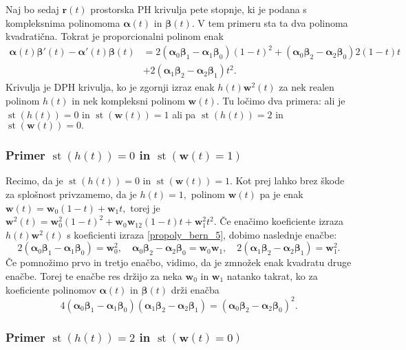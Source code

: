 \documentclass[12pt,a4paper,twoside]{article}
\theoremstyle{definition} %
\theoremstyle{plain} %
\numberwithin{equation}{section}  %
\newcommand{\rV}{\mathbf{r}}
\newcommand{\wV}{\mathbf{w}}
\newcommand{\balpha}{\boldsymbol \alpha}
\newcommand{\bbeta}{\boldsymbol \beta}
\DeclareMathOperator{\st}{st}
\begin{document}
Naj bo sedaj $\rV(t)$ prostorska PH krivulja pete stopnje, ki je podana s kompleksnima polinomoma $\balpha(t)$ in $\bbeta(t).$ V tem primeru sta ta dva polinoma kvadratična. Tokrat je proporcionalni polinom enak
\begin{align}
	\balpha(t)\bbeta'(t)-\balpha'(t)\bbeta(t)&=2(\balpha_0\bbeta_1-\balpha_1\bbeta_0)(1-t)^2+(\balpha_0\bbeta_2-\balpha_2\bbeta_0)2(1-t)t\nonumber\\
	&+2(\balpha_1\bbeta_2-\balpha_2\bbeta_1)t^2.\label{propoly_bern_5}
\end{align}
Krivulja je DPH krivulja, ko je zgornji izraz enak $h(t)\wV^2(t)$ za nek realen polinom $h(t)$ in nek kompleksni polinom $\wV(t).$ Tu ločimo dva primera: ali je $\st(h(t))=0$ in $\st(\wV(t))=1$ ali pa $\st(h(t))=2$ in $\st(\wV(t))=0.$

\subsubsection{Primer \texorpdfstring{$\st(h(t))=0$}{st(h(t))=0} in \texorpdfstring{$\st(\wV(t)=1)$}{st(w(t))=1}}

Recimo, da je $\st(h(t))=0$ in $\st(\wV(t))=1.$ Kot prej lahko brez škode za splošnost privzamemo, da je $h(t)=1,$ polinom $\wV(t)$ pa je enak $\wV(t)=\wV_0(1-t)+\wV_1t,$ torej je $\wV^2(t)=\wV_0^2(1-t)^2+\wV_0\wV_12(1-t)t+\wV_1^2t^2.$ Če enačimo koeficiente izraza $h(t)\wV^2(t)$ s koeficienti izraza \eqref{propoly_bern_5}, dobimo naslednje enačbe:
\begin{equation}
	2(\balpha_0\bbeta_1-\balpha_1\bbeta_0)=\wV_0^2,\quad \balpha_0\bbeta_2-\balpha_2\bbeta_0=\wV_0\wV_1,\quad 2(\balpha_1\bbeta_2-\balpha_2\bbeta_1)=\wV_1^2.
\end{equation}
Če pomnožimo prvo in tretjo enačbo, vidimo, da je zmnožek enak kvadratu druge enačbe. Torej te enačbe res držijo za neka $\wV_0$ in $\wV_1$ natanko takrat, ko za koeficiente polinomov $\balpha(t)$ in $\bbeta(t)$ drži enačba
\begin{equation}
	\label{st5h0w1}
	4(\balpha_0\bbeta_1-\balpha_1\bbeta_0)(\balpha_1\bbeta_2-\balpha_2\bbeta_1)=(\balpha_0\bbeta_2-\balpha_2\bbeta_0)^2.
\end{equation}

\subsubsection{Primer \texorpdfstring{$\st(h(t))=2$}{st(h(t))=2} in \texorpdfstring{$\st(\wV(t)=0)$}{st(w(t))=0}}
\end{document}
